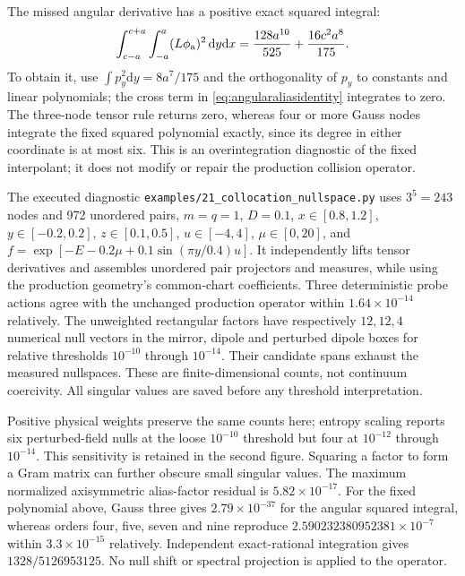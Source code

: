 \documentclass[11pt,letterpaper]{article}
\newcommand{\dd}{\mathrm d}
\begin{document}
The missed angular derivative has a positive exact squared integral:
\begin{equation}
 \int_{c-a}^{c+a}\int_{-a}^{a}(L\phi_{\rm a})^2\,\dd y\dd x
 =\frac{128a^{10}}{525}+\frac{16c^2a^8}{175}.
 \label{eq:angularaliasintegral}
\end{equation}
To obtain it, use $\int p_y^2\dd y=8a^7/175$ and the orthogonality of
$p_y$ to constants and linear polynomials; the cross term in
\eqref{eq:angularaliasidentity} integrates to zero. The three-node tensor
rule returns zero, whereas four or more Gauss nodes integrate the fixed
squared polynomial exactly, since its degree in either coordinate is at
most six. This is an overintegration diagnostic of the fixed interpolant;
it does not modify or repair the production collision operator.

The executed diagnostic \texttt{examples/21\_collocation\_nullspace.py}
uses $3^5=243$ nodes and 972 unordered pairs, $m=q=1$, $D=0.1$,
$x\in[0.8,1.2]$, $y\in[-0.2,0.2]$, $z\in[0.1,0.5]$,
$u\in[-4,4]$, $\mu\in[0,20]$, and
$f=\exp[-E-0.2\mu+0.1\sin(\pi y/0.4)u]$.
It independently lifts tensor derivatives and assembles unordered pair
projectors and measures, while using the production geometry's common-chart
coefficients. Three deterministic probe actions agree with the unchanged
production operator within $1.64\times10^{-14}$ relatively. The unweighted
rectangular factors have respectively $12,12,4$ numerical null vectors in the
mirror, dipole and perturbed dipole boxes for relative thresholds
$10^{-10}$ through $10^{-14}$. Their candidate spans exhaust the measured
nullspaces. These are finite-dimensional counts, not continuum coercivity.
All singular values are saved before any threshold interpretation.

Positive physical weights preserve the same counts here; entropy scaling
reports six perturbed-field nulls at the loose $10^{-10}$ threshold but four
at $10^{-12}$ through $10^{-14}$. This sensitivity is retained in the second
figure. Squaring a factor to form a Gram matrix can further obscure small
singular values. The maximum normalized axisymmetric alias-factor residual
is $5.82\times10^{-17}$. For the fixed polynomial above, Gauss three gives
$2.79\times10^{-37}$ for the angular squared integral, whereas orders four,
five, seven and nine reproduce $2.590232380952381\times10^{-7}$ within
$3.3\times10^{-15}$ relatively. Independent exact-rational integration gives
$1328/5126953125$. No null shift or spectral projection is applied to the operator.
\end{document}
